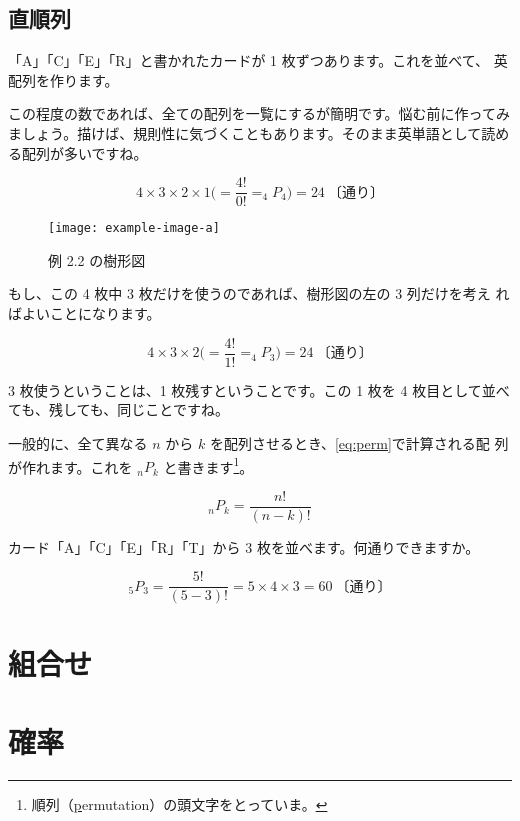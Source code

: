 \subsection{直順列}

\extitle「A」「C」「E」「R」と書かれたカードが 1 枚ずつあります。これを並べて、 英配列を作ります。 

この程度の数であれば、全ての配列を一覧にするが簡明です。悩む前に作ってみましょう。描けば、規則性に気づくこともあります。そのまま英単語として読める配列が多いですね。

\begin{equation*}
   4\times3\times2\times1\bigg(=\frac{4!}{0!}=_4P_4\bigg)=24~\textrm{〔通り〕}
\end{equation*}

\begin{figure}[hb]\centering
    \texttt{[image: example-image-a]}
    \caption{例 2.2 の樹形図}
\end{figure}

\extitle もし、この 4 枚中 3 枚だけを使うのであれば、樹形図の左の 3 列だけを考え ればよいことになります。

\begin{equation*}
    4\times3\times2\bigg(=\frac{4!}{1!}=_4P_3\bigg)=24~\textrm{〔通り〕}
\end{equation*}

3 枚使うということは、1 枚残すということです。この 1 枚を 4 枚目として並べても、残しても、同じことですね。

一般的に、全て異なる $n$ から $k$ を配列させるとき、\cref{eq:perm}で計算される配 列が作れます。これを $_nP_k$ と書きます\footnote{順列（\underline{p}ermutation）の頭文字をとっていま。}。

\begin{equation}\label{eq:perm}
    _nP_k = \frac{n!}{(n-k)!}
\end{equation}

\begin{simQ}
    カード「A」「C」「E」「R」「T」から 3 枚を並べます。何通りできますか。
\end{simQ}

\begin{simA}
    \begin{equation*}
        _5P_3 = \frac{5!}{(5-3)!}=5\times4\times3=60~\text{〔通り〕}
    \end{equation*}
\end{simA}

\section{組合せ}

\section{確\quad 率}

\begin{exercise}
    \item 
\end{exercise}